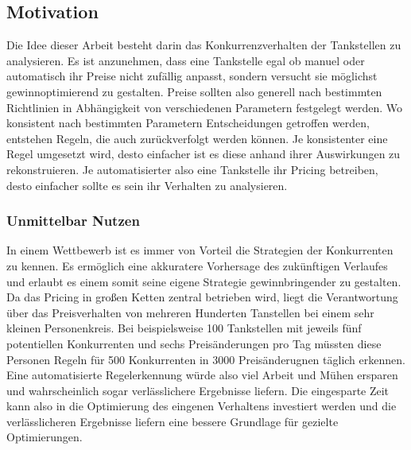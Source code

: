 \documentclass[12pt,a4paper,bibliography=totocnumbered,listof=totocnumbered]{scrartcl}
\begin{document}
\subsection{Motivation}
Die Idee dieser Arbeit besteht darin das Konkurrenzverhalten der Tankstellen zu analysieren. Es ist anzunehmen, dass eine Tankstelle egal ob manuel oder automatisch ihr Preise nicht zufällig anpasst, sondern versucht sie möglichst gewinnoptimierend zu gestalten. Preise sollten also generell nach bestimmten Richtlinien in Abhängigkeit von verschiedenen Parametern festgelegt werden. Wo konsistent nach bestimmten Parametern Entscheidungen getroffen werden, entstehen Regeln, die auch zurückverfolgt werden können. Je konsistenter eine Regel umgesetzt wird, desto einfacher ist es diese anhand ihrer Auswirkungen zu rekonstruieren. Je automatisierter also eine Tankstelle ihr Pricing betreiben, desto einfacher sollte es sein ihr Verhalten zu analysieren.\\

\subsubsection{Unmittelbar Nutzen}
In einem Wettbewerb ist es immer von Vorteil die Strategien der Konkurrenten zu kennen. Es ermöglich eine akkuratere Vorhersage des zukünftigen Verlaufes und erlaubt es einem somit seine eigene Strategie gewinnbringender zu gestalten. Da das Pricing in großen Ketten zentral betrieben wird, liegt die Verantwortung über das Preisverhalten von mehreren Hunderten Tanstellen bei einem sehr kleinen Personenkreis. Bei beispielsweise 100 Tankstellen mit jeweils fünf potentiellen Konkurrenten und sechs Preisänderungen pro Tag müssten diese Personen Regeln für 500 Konkurrenten in 3000 Preisänderugnen täglich erkennen. Eine automatisierte Regelerkennung würde also viel Arbeit und Mühen ersparen und wahrscheinlich sogar verlässlichere Ergebnisse liefern. Die eingesparte Zeit kann also in die Optimierung des eingenen Verhaltens investiert werden und die verlässlicheren Ergebnisse liefern eine bessere Grundlage für gezielte Optimierungen.\\

\end{document}
